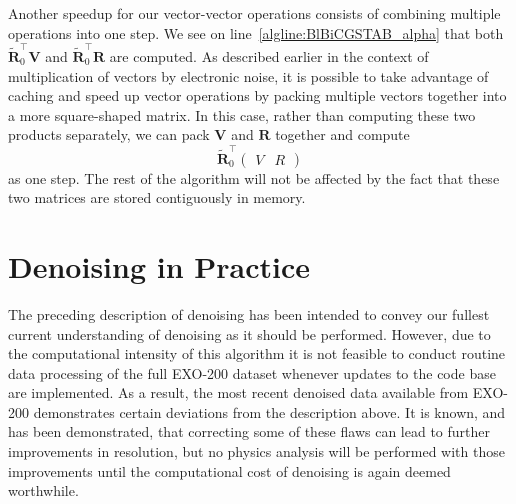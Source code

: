 Another speedup for our vector-vector operations consists of combining multiple operations into one step.  We see on line~\ref{algline:BlBiCGSTAB_alpha} that both $\mathbf{\widetilde{R}}_0^\top \mathbf{V}$ and $\mathbf{\widetilde{R}}_0^\top \mathbf{R}$ are computed.  As described earlier in the context of multiplication of vectors by electronic noise, it is possible to take advantage of caching and speed up vector operations by packing multiple vectors together into a more square-shaped matrix.  In this case, rather than computing these two products separately, we can pack $\mathbf{V}$ and $\mathbf{R}$ together and compute
\begin{equation}
\mathbf{\widetilde{R}}_0^\top \begin{pmatrix} V & R \end{pmatrix}
\end{equation}
as one step.  The rest of the algorithm will not be affected by the fact that these two matrices are stored contiguously in memory.

\section{Denoising in Practice}\label{sec:DenoisingInPractice}

The preceding description of denoising has been intended to convey our fullest current understanding of denoising as it should be performed.  However, due to the computational intensity of this algorithm it is not feasible to conduct routine data processing of the full EXO-200 dataset whenever updates to the code base are implemented.  As a result, the most recent denoised data available from EXO-200 demonstrates certain deviations from the description above.  It is known, and has been demonstrated, that correcting some of these flaws can lead to further improvements in resolution, but no physics analysis will be performed with those improvements until the computational cost of denoising is again deemed worthwhile.

